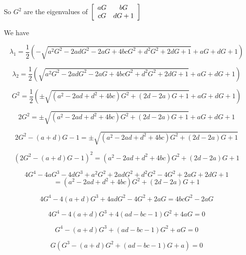 \documentclass[12pt]{article}
\begin{document}
So $G^2$ are the eigenvalues of $\left[\begin{array}{c c}
aG & bG \\
cG & dG + 1
\end{array} \right]$

We have

\[\lambda_1 = \frac{1}{2}\left(-\sqrt{a^2G^2 - 2adG^2 - 2aG + 4bcG^2 + d^2G^2 + 2dG +1} + aG + dG + 1\right)\]

\[\lambda_2 = \frac{1}{2}\left(\sqrt{a^2G^2 - 2adG^2 - 2aG + 4bcG^2 + d^2G^2 + 2dG +1} + aG + dG + 1\right)\]

\[G^2 = \frac{1}{2}\left(\pm\sqrt{\left(a^2 - 2ad + d^2 + 4bc \right)G^2 + \left(2d - 2a\right) G +1} + aG + dG + 1\right)\]

\[2G^2 = \pm\sqrt{\left(a^2 - 2ad + d^2 + 4bc \right)G^2 + \left(2d - 2a\right) G +1} + aG + dG + 1\]

\[2G^2 - (a + d)G - 1 = \pm\sqrt{\left(a^2 - 2ad + d^2 + 4bc \right)G^2 + \left(2d - 2a\right) G +1}\]

\[\left(2G^2 - (a + d)G - 1 \right)^2 = \left(a^2 - 2ad + d^2 + 4bc \right)G^2 + \left(2d - 2a\right) G +1\]

\[4G^4 -4aG^3 - 4dG^3  + a^2 G^2 + 2adG^2 + d^2G^2 - 4G^2 + 2aG + 2dG + 1\] 
\[  = \left(a^2 - 2ad + d^2 + 4bc \right)G^2 + \left(2d - 2a\right) G +1\]

\[4G^4 -4\left(a+d\right)G^3 + 4adG^2 - 4G^2 + 2aG  = 4bcG^2 - 2a G\]

\[4G^4 -4\left(a+d\right)G^3 + 4(ad - bc - 1)G^2  + 4aG  = 0 \]

\[G^4 -\left(a+d\right)G^3 + (ad - bc - 1)G^2  + aG  = 0 \]

\[G\left(G^3 -\left(a+d\right)G^2 + (ad - bc - 1)G  + a\right)  = 0 \]
\end{document}
